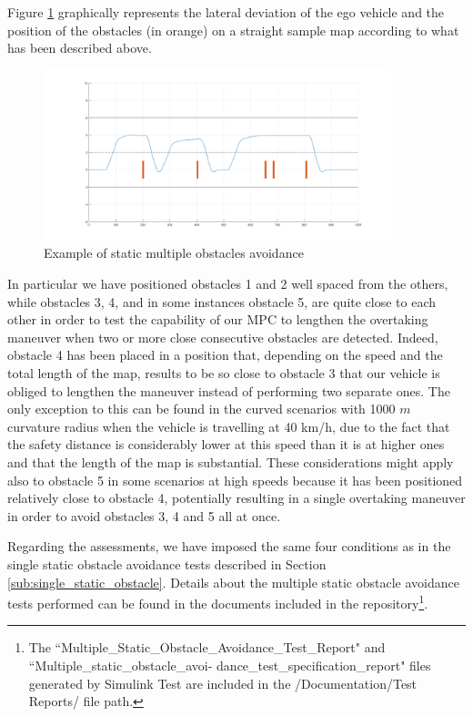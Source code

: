 \vspace{5mm}

Figure \ref{fig:obstacle} graphically represents the lateral deviation of the ego vehicle and the position of the obstacles (in orange) on a straight sample map according to what has been described above.


\begin{figure}[H]
    \centering
    \includegraphics[width=0.9\textwidth,keepaspectratio]{Figures/multiple.png}
    \caption{Example of static multiple obstacles avoidance}
    \label{fig:obstacle}
\end{figure}


In particular we have positioned obstacles 1 and 2 well spaced from the others, while obstacles 3, 4, and in some instances obstacle 5, are quite close to each other in order to test the capability of our MPC to lengthen the overtaking maneuver when two or more close consecutive obstacles are detected. Indeed, obstacle 4 has been placed in a position that, depending on the speed and the total length of the map, results to be so close to obstacle 3 that our vehicle is obliged to lengthen the maneuver instead of performing two separate ones. The only exception to this can be found in the curved scenarios with 1000 $m$ curvature radius when the vehicle is travelling at 40 km/h, due to the fact that the safety distance is considerably lower at this speed than it is at higher ones and that the length of the map is substantial.
These considerations might apply also to obstacle 5 in some scenarios at high speeds because it has been positioned relatively close to obstacle 4, potentially resulting in a single overtaking maneuver in order to avoid obstacles 3, 4 and 5 all at once.

Regarding the assessments, we have imposed the same four conditions as in the single static obstacle avoidance tests described in Section \ref{sub:single_static_obstacle}.
Details about the multiple static obstacle avoidance tests performed can be found in the documents included in the repository\footnote{The ``Multiple\_Static\_Obstacle\_Avoidance\_Test\_Report" and ``Multiple\_static\_obstacle\_avoi- dance\_test\_specification\_report" files generated by Simulink Test are included in the /Documentation/Test Reports/ file path.}.

